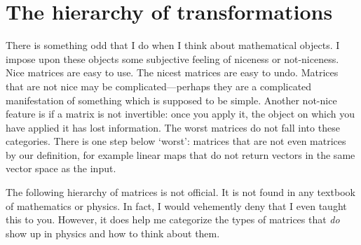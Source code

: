 \documentclass[12pt, oneside]{report}    %
\let\oldsection\section
\def\section{%
  \setcounter{sidenote}{1}%
  \oldsection
}
\begin{document}
\section{The hierarchy of transformations}
\label{sec:hierarchy:of:transformations}

There is something odd that I do when I think about mathematical objects. I impose upon these objects some subjective feeling of niceness or not-niceness. Nice matrices are easy to use. The nicest matrices are easy to undo. Matrices that are not nice may be complicated---perhaps they are a complicated manifestation of something which is supposed to be simple. Another not-nice feature is if a matrix is not invertible: once you apply it, the object on which you have applied it has lost information. The worst matrices do not fall into these categories. There is one step below `worst': matrices that are not even matrices by our definition, for example linear maps that do not return vectors in the same vector space as the input.

The following hierarchy of matrices is not official. It is not found in any textbook of mathematics or physics. In fact, I would vehemently deny that I even taught this to you. However, it does help me categorize the types of matrices that \emph{do} show up in physics and how to think about them.
\end{document}

